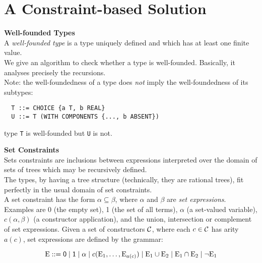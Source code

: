 \documentclass[12pt]{article}
\begin{document}
\section{A Constraint-based Solution}
\begin{slide}

\textbf{Well-founded Types}\\

A \emph{well-founded type} is a type uniquely defined and which has at
least one finite value.\\

We give an algorithm to check whether a type is
well-founded. Basically, it analyses precisely the recursions.\\

Note: the well-foundedness of a type does \emph{not} imply the
well-foundedness of its subtypes:

\begin{verbatim}
  T ::= CHOICE {a T, b REAL}
  U ::= T (WITH COMPONENTS {..., b ABSENT})
\end{verbatim}

type \verb+T+ is well-founded but \verb+U+ is not.

\pagebreak

\textbf{Set Constraints}\\

Sets constraints are inclusions between expressions interpreted over
the domain of sets of trees which may be recursively defined.\\

The \ASN types, by having a tree structure (technically, they are
rational trees), fit perfectly in the usual domain of set
constraints.\\

A set constraint has the form $\alpha \subseteq \beta$, where $\alpha$
and $\beta$ are \emph{set expressions}. Examples are \textsf{0} (the
empty set), \textsf{1} (the set of all terms), $\alpha$ (a set-valued
variable), $c(\alpha, \beta)$ (a constructor application), and the
union, intersection or complement of set expressions. Given a set of
constructors ${\cal C}$, where each $c \in {\cal C}$ has arity $a(c)$,
set expressions are defined by the grammar:

$$\textnormal{E} ::= \textsf{0} \mid \textsf{1} \mid \alpha \mid c (\textnormal{E}_1, \ldots,
\textnormal{E}_{a(c)}) \mid \textnormal{E}_1 \cup \textnormal{E}_2 \mid \textnormal{E}_1 \cap \textnormal{E}_2 \mid \neg \textnormal{E}_1$$

\pagebreak


\end{slide}
\end{document}
